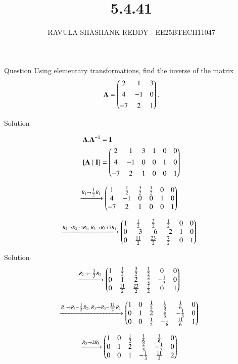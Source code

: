 \documentclass{beamer}
\title %
{5.4.41}
\author %
{RAVULA SHASHANK REDDY - EE25BTECH11047}
\begin{document}
	
	
	\frame{\titlepage}
	\begin{frame}{Question}
    Using elementary transformations, find the inverse of the matrix
\begin{align*}
    \mathbf{A}=\begin{pmatrix}2 & 1 & 3 \\[4pt] 4 & -1 & 0 \\[4pt] -7 & 2 & 1\end{pmatrix}.
\end{align*}

\end{frame}
\begin{frame}{Solution}

    \begin{align}
    \vec{A}.\vec{A}^{-1}&=\vec{I}\\
    [\vec{A}\mid \vec{I}] &= 
\myvec{2 & 1 & 3 & 1 & 0 & 0 \\[4pt]
       4 & -1 & 0 & 0 & 1 & 0 \\[4pt]
      -7 & 2 & 1 & 0 & 0 & 1}
\end{align}

\begin{align}
&\xrightarrow{R_1 \to \tfrac12 R_1}
\begin{pmatrix}1 & \tfrac12 & \tfrac32 & \tfrac12 & 0 & 0 \\
       4 & -1 & 0 & 0 & 1 & 0 \\
      -7 & 2 & 1 & 0 & 0 & 1\end{pmatrix}
\end{align}

\begin{align}
&\xrightarrow{R_2 \to R_2-4R_1,\; R_3 \to R_3+7R_1}
\begin{pmatrix}1 & \tfrac12 & \tfrac32 & \tfrac12 & 0 & 0 \\
       0 & -3 & -6 & -2 & 1 & 0 \\
       0 & \tfrac{11}{2} & \tfrac{23}{2} & \tfrac{7}{2} & 0 & 1\end{pmatrix}
\end{align}

\end{frame}
\begin{frame}{Solution}
\begin{align}
&\xrightarrow{R_2 \to -\tfrac13 R_2}
\begin{pmatrix}1 & \tfrac12 & \tfrac32 & \tfrac12 & 0 & 0 \\
       0 & 1 & 2 & \tfrac23 & -\tfrac13 & 0 \\
       0 & \tfrac{11}{2} & \tfrac{23}{2} & \tfrac{7}{2} & 0 & 1\end{pmatrix}
\end{align}

\begin{align}
&\xrightarrow{R_1 \to R_1-\tfrac12R_2,\; R_3 \to R_3-\tfrac{11}{2}R_2}
\begin{pmatrix}1 & 0 & \tfrac12 & \tfrac16 & \tfrac16 & 0 \\
       0 & 1 & 2 & \tfrac23 & -\tfrac13 & 0 \\
       0 & 0 & \tfrac12 & -\tfrac16 & \tfrac{11}{6} & 1\end{pmatrix}
\end{align}

\begin{align}
&\xrightarrow{R_3 \to 2R_3}
\begin{pmatrix}1 & 0 & \tfrac12 & \tfrac16 & \tfrac16 & 0 \\
       0 & 1 & 2 & \tfrac23 & -\tfrac13 & 0 \\
       0 & 0 & 1 & -\tfrac13 & \tfrac{11}{3} & 2\end{pmatrix}
\end{align}
\end{frame}
\end{document}
